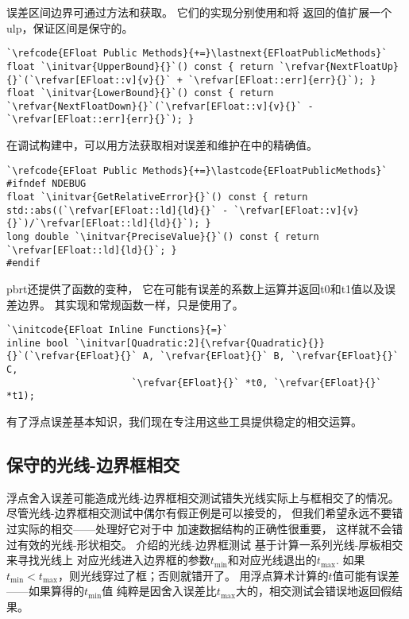 误差区间边界可通过方法和获取。
它们的实现分别使用和将
返回的值扩展一个ulp，保证区间是保守的。
\begin{lstlisting}
`\refcode{EFloat Public Methods}{+=}\lastnext{EFloatPublicMethods}`
float `\initvar{UpperBound}{}`() const { return `\refvar{NextFloatUp}{}`(`\refvar[EFloat::v]{v}{}` + `\refvar[EFloat::err]{err}{}`); }
float `\initvar{LowerBound}{}`() const { return `\refvar{NextFloatDown}{}`(`\refvar[EFloat::v]{v}{}` - `\refvar[EFloat::err]{err}{}`); }
\end{lstlisting}

在调试构建中，可以用方法获取相对误差和维护在中的精确值。
\begin{lstlisting}
`\refcode{EFloat Public Methods}{+=}\lastcode{EFloatPublicMethods}`
#ifndef NDEBUG
float `\initvar{GetRelativeError}{}`() const { return std::abs((`\refvar[EFloat::ld]{ld}{}` - `\refvar[EFloat::v]{v}{}`)/`\refvar[EFloat::ld]{ld}{}`); }
long double `\initvar{PreciseValue}{}`() const { return `\refvar[EFloat::ld]{ld}{}`; }
#endif
\end{lstlisting}

pbrt还提供了函数的变种，
它在可能有误差的系数上运算并返回{\ttfamily t0}和{\ttfamily t1}值以及误差边界。
其实现和常规函数一样，只是使用了。
\begin{lstlisting}
`\initcode{EFloat Inline Functions}{=}`
inline bool `\initvar[Quadratic:2]{\refvar{Quadratic}{}}{}`(`\refvar{EFloat}{}` A, `\refvar{EFloat}{}` B, `\refvar{EFloat}{}` C,
                      `\refvar{EFloat}{}` *t0, `\refvar{EFloat}{}` *t1);
\end{lstlisting}

有了浮点误差基本知识，我们现在专注用这些工具提供稳定的相交运算。

\subsection{保守的光线-边界框相交}\label{sub:保守的光线-边界框相交}
浮点舍入误差可能造成光线-边界框相交测试错失光线实际上与框相交了的情况。
尽管光线-边界框相交测试中偶尔有假正例是可以接受的，
但我们希望永远不要错过实际的相交——处理好它对于中
加速数据结构的正确性很重要，
这样就不会错过有效的光线-形状相交。
介绍的光线-边界框测试
基于计算一系列光线-厚板相交来寻找光线上
对应光线进入边界框的参数$t_{\min}$和对应光线退出的$t_{\max}$.
如果$t_{\min}<t_{\max}$，则光线穿过了框；否则就错开了。
用浮点算术计算的$t$值可能有误差——如果算得的$t_{\min}$值
纯粹是因舍入误差比$t_{\max}$大的，相交测试会错误地返回假结果。

